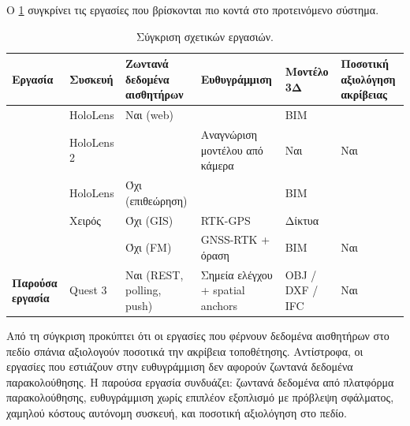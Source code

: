 Ο \cref{tab:rw-comparison} συγκρίνει τις εργασίες που βρίσκονται πιο κοντά στο προτεινόμενο σύστημα.

\begin{table}[htbp]
  \centering
  \footnotesize
  \caption{Σύγκριση σχετικών εργασιών.}
  \label{tab:rw-comparison}
  \setlength{\tabcolsep}{4pt}
  \begin{tabularx}{\textwidth}{@{}>{\raggedright\arraybackslash}X
      >{\raggedright\arraybackslash}p{1.6cm} >{\raggedright\arraybackslash}p{1.9cm}
      >{\raggedright\arraybackslash}p{2.6cm} >{\raggedright\arraybackslash}p{1.7cm}
      >{\raggedright\arraybackslash}p{1.6cm}@{}}
    \toprule
    Εργασία & Συσκευή & Ζωντανά δεδομένα αισθητήρων & Ευθυγράμμιση & Μοντέλο 3Δ & Ποσοτική αξιολόγηση ακρίβειας \\
    \midrule
    \cite{fawad2024bridge} & HoloLens & Ναι (web) & \fillin{;} & BIM & \fillin{;} \\
    \cite{awadallah2025ar} & HoloLens 2 & \fillin{;} & Αναγνώριση μοντέλου από κάμερα & Ναι & Ναι \\
    \cite{nguyen2022holobridge} & HoloLens & Όχι (επιθεώρηση) & \fillin{;} & BIM & \fillin{;} \\
    \cite{schall2009handheld} & Χειρός & Όχι (GIS) & RTK-GPS & Δίκτυα & \fillin{;} \\
    \cite{messi2024seamless} & \fillin{;} & Όχι (FM) & GNSS-RTK + όραση & BIM & Ναι \\
    \midrule
    \textbf{Παρούσα εργασία} & Quest 3 & Ναι (REST, polling, push) & Σημεία ελέγχου + spatial anchors & OBJ / DXF / IFC & Ναι \\
    \bottomrule
  \end{tabularx}
\end{table}


Από τη σύγκριση προκύπτει ότι οι εργασίες που φέρνουν δεδομένα αισθητήρων στο πεδίο σπάνια αξιολογούν ποσοτικά την ακρίβεια τοποθέτησης. Αντίστροφα, οι εργασίες που εστιάζουν στην ευθυγράμμιση δεν αφορούν ζωντανά δεδομένα παρακολούθησης. Η παρούσα εργασία συνδυάζει: ζωντανά δεδομένα από πλατφόρμα παρακολούθησης, ευθυγράμμιση χωρίς επιπλέον εξοπλισμό με πρόβλεψη σφάλματος, χαμηλού κόστους αυτόνομη συσκευή, και ποσοτική αξιολόγηση στο πεδίο.

